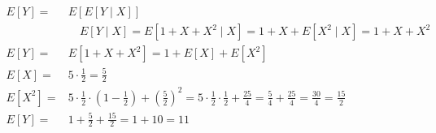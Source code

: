 \documentclass{article}
\begin{document}
\[
    \begin{aligned}
        E[Y]   = & E[E[Y \mid X]]                                                                                                                                                                                        \\
                 & \phantom{E[}E[Y \mid X]  = E[1 + X + X^2 \mid X] = 1 + X + E[X^2 \mid X] = 1 + X + X^2                                                                                                                \\
        E[Y]   = & E[1 + X + X^2] = 1 + E[X] + E[X^2]                                                                                                                                                                    \\
        E[X]   = & 5 \cdot \frac{1}{2} = \frac{5}{2}                                                                                                                                                                     \\
        E[X^2] = & 5 \cdot \frac{1}{2} \cdot \left(1 - \frac{1}{2}\right) + \left(\frac{5}{2}\right)^2 = 5 \cdot \frac{1}{2} \cdot \frac{1}{2} + \frac{25}{4} = \frac{5}{4} + \frac{25}{4} = \frac{30}{4} = \frac{15}{2} \\
        E[Y]   = & 1 + \frac{5}{2} + \frac{15}{2} = 1 + 10 = 11
    \end{aligned}
\]
\end{document}
